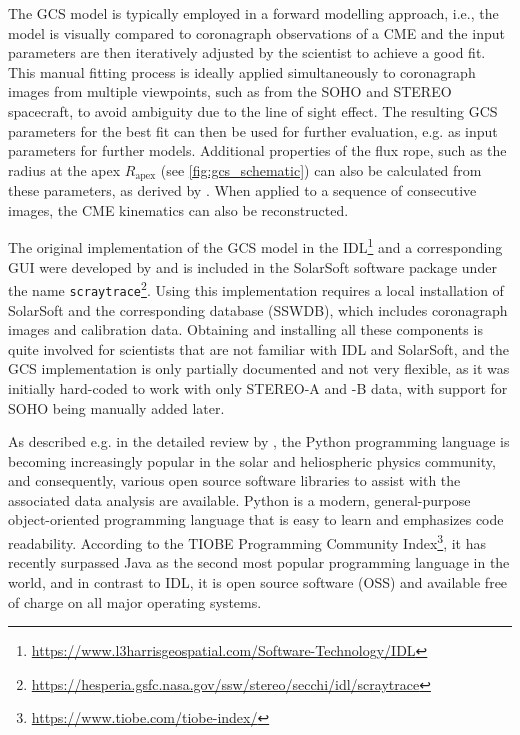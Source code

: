 The \ac{GCS} model is typically employed in a forward modelling approach, i.e., the model is visually compared to coronagraph observations of a \ac{CME} and the input parameters are then iteratively adjusted by the scientist to achieve a good fit. This manual fitting process is ideally applied simultaneously to coronagraph images from multiple viewpoints, such as from the \ac{SOHO} and \ac{STEREO} spacecraft, to avoid ambiguity due to the line of sight effect. The resulting \ac{GCS} parameters for the best fit can then be used for further evaluation, e.g. as input parameters for further models. Additional properties of the flux rope, such as the radius at the apex $R_\text{apex}$ (see \autoref{fig:gcs_schematic}) can also be calculated from these parameters, as derived by \citep{Thernisien-2011-GCS}. When applied to a sequence of consecutive images, the \ac{CME} kinematics can also be reconstructed.

The original implementation of the \ac{GCS} model in the \ac{IDL}\footnote{\url{https://www.l3harrisgeospatial.com/Software-Technology/IDL}} and a corresponding \ac{GUI} were developed by \citet{Thernisien-2006-GCS} and is included in the SolarSoft software package \citep{Freeland-1998-SolarSoft} under the name \texttt{scraytrace}\footnote{\url{https://hesperia.gsfc.nasa.gov/ssw/stereo/secchi/idl/scraytrace}}.
Using this implementation requires a local installation of SolarSoft and the corresponding database (SSWDB), which includes coronagraph images and calibration data. Obtaining and installing all these components is quite involved for scientists that are not familiar with \ac{IDL} and SolarSoft, and the \ac{GCS} implementation is only partially documented and not very flexible, as it was initially hard-coded to work with only \ac{STEREO}-A and -B data, with support for \ac{SOHO} being manually added later.

As described e.g. in the detailed review by \citet{Burrell-2018}, the Python programming language is becoming increasingly popular in the solar and heliospheric physics community, and consequently, various open source software libraries to assist with the associated data analysis are available. Python is a modern, general-purpose object-oriented programming language that is easy to learn and emphasizes code readability. According to the TIOBE Programming Community Index\footnote{\url{https://www.tiobe.com/tiobe-index/}}, it has recently surpassed Java as the second most popular programming language in the world, and in contrast to \ac{IDL}, it is open source software (OSS) and available free of charge on all major operating systems.

